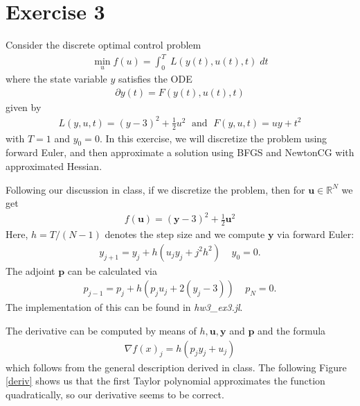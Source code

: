 \documentclass{article}
\begin{document}
\section{Exercise 3}
Consider the discrete optimal control problem
\begin{align*}
  \min_{u} f(u)=\int_{0}^{T}\; L(y(t),u(t),t)\; dt
\end{align*}
where the state variable $y$ satisfies the ODE
\begin{align*}
  \partial y(t)=F(y(t),u(t),t)
\end{align*}
 given by
\begin{align*}
  L(y,u,t)=(y-3)^2+\frac{1}{2}u^2 \; \textrm{ and } \; F(y,u,t)=uy+t^2
\end{align*}
with $T=1$ and $y_0=0$. In this exercise, we will discretize the problem using forward
Euler, and then approximate a solution using BFGS and NewtonCG with approximated Hessian. \par
Following our discussion in class, if we discretize the problem, then for $\boldsymbol{u} \in \mathbb{R}^{N}$ we get
\begin{align*}
  f(\boldsymbol{u})=(\boldsymbol{y}-3)^2+\frac{1}{2}\boldsymbol{u}^{2}
\end{align*}
Here, $h=T/(N-1)$ denotes the step size and we compute $\boldsymbol{y}$ via forward Euler:
\begin{align*}
  y_{j+1}=y_{j}+h(u_{j}y_{j}+j^2h^2)\;\;\;\; y_{0}=0.
\end{align*}
The adjoint $\boldsymbol{p}$ can be calculated via
\begin{align*}
  p_{j-1}=p_{j}+h(p_{j}u_{j}+2(y_{j}-3)) \; \;\;\; p_{N}=0.
\end{align*}
The implementation of this can be found in \emph{hw3\_ex3.jl}.\par
The derivative can be computed by means of $h,\boldsymbol{u},\boldsymbol{y}$ and $\boldsymbol{p}$
and the formula
\begin{align*}
  \nabla f(x)_{j}=h \left( p_{j} y_{j}+u_{j}  \right)
\end{align*}
which follows from the general description derived in class. The following Figure \ref{deriv}
shows us that the first Taylor polynomial  approximates the
function quadratically, so our derivative seems to be correct.
\end{document}

